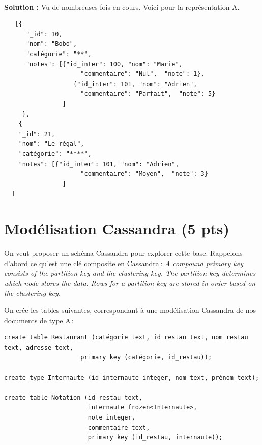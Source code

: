 \documentclass[10pt,a4paper]{article}
\newenvironment{solution}[0]{
~\\ \color{red} \textbf{Solution : }\color{black}}{%
}
\begin{document}
\begin{solution}
Vu de nombreuses fois en cours. Voici pour la représentation A.
\begin{verbatim}
   [{
      "_id": 10,
      "nom": "Bobo",
      "catégorie": "**",
      "notes": [{"id_inter": 100, "nom": "Marie", 
                     "commentaire": "Nul",  "note": 1},
                   {"id_inter": 101, "nom": "Adrien", 
                     "commentaire": "Parfait",  "note": 5}
                ]
     },
    {
    "_id": 21,
    "nom": "Le régal",
    "catégorie": "****",
    "notes": [{"id_inter": 101, "nom": "Adrien", 
                     "commentaire": "Moyen",  "note": 3}
                ]
  ]
\end{verbatim}
\end{solution}

\section{Modélisation Cassandra (5 pts)}

On veut proposer un schéma Cassandra pour explorer cette base. 
Rappelons d'abord ce qu'est une clé composite en Cassandra\,: 
\textit{A compound primary key consists of the partition key and the clustering key. The partition key determines 
which node stores the data. Rows 
for a partition key are stored in order based on the clustering key.} 

On crée les tables suivantes, correspondant à une modélisation Cassandra de 
nos documents de type A\,:
\begin{verbatim}
create table Restaurant (catégorie text, id_restau text, nom restau text, adresse text,
                     primary key (catégorie, id_restau));

create type Internaute (id_internaute integer, nom text, prénom text);                 

create table Notation (id_restau text,
                       internaute frozen<Internaute>,
                       note integer,
                       commentaire text,
                       primary key (id_restau, internaute));
\end{verbatim}
\end{document}
